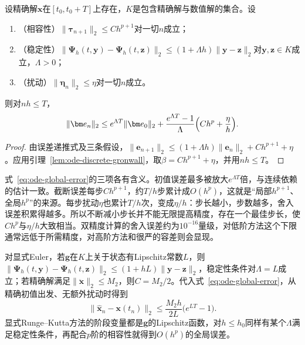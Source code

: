 \begin{theorem}[一步方法的有限时域收敛]
  \label{thm:ode-one-step-convergence}
  设精确解$\bm x$在$[t_0,t_0+T]$上存在，$K$是包含精确解与数值解的集合。设
  \begin{enumerate}
    \item （相容性）$\|\bm\tau_{n+1}\|_2\leq Ch^{p+1}$对一切$n$成立；
    \item （稳定性）$\|\bm\Psi_h(t,\bm y)-\bm\Psi_h(t,\bm z)\|_2\leq(1+\Lambda h)\|\bm y-\bm z\|_2$对$\bm y,\bm z\in K$成立，$\Lambda>0$；
    \item （扰动）$\|\bm\eta_n\|_2\leq\eta$对一切$n$成立。
  \end{enumerate}
  则对$nh\leq T$，
  \begin{equation}
    \|\bm e_n\|_2\leq e^{\Lambda T}\|\bm e_0\|_2+\frac{e^{\Lambda T}-1}{\Lambda}\Bigl(Ch^p+\frac\eta h\Bigr).
    \label{eq:ode-global-error}
  \end{equation}
\end{theorem}

\begin{proof}
  由误差递推式及三条假设，$\|\bm e_{n+1}\|_2\leq(1+\Lambda h)\|\bm e_n\|_2+Ch^{p+1}+\eta$。应用引理~\ref{lem:ode-discrete-gronwall}，取$\beta=Ch^{p+1}+\eta$，并用$nh\leq T$。
\end{proof}

式~\eqref{eq:ode-global-error}的三项各有含义。初值误差最多被放大$e^{\Lambda T}$倍，与连续依赖的估计一致。截断误差每步$Ch^{p+1}$，约$T/h$步累计成$O(h^p)$，这就是“局部$h^{p+1}$、全局$h^p$”的来源。每步扰动$\eta$也累计$T/h$次，变成$\eta/h$：步长越小，步数越多，舍入误差积累得越多。所以不断减小步长并不能无限提高精度，存在一个最佳步长，使$Ch^p$与$\eta/h$大致相当。双精度计算的舍入误差约为$10^{-16}$量级，对低阶方法这个下限通常远低于所需精度，对高阶方法和很严的容差则会显现。

对显式Euler，若$\bm g$在$K$上关于状态有Lipschitz常数$L$，则$\|\bm\Psi_h(t,\bm y)-\bm\Psi_h(t,\bm z)\|_2\leq(1+hL)\|\bm y-\bm z\|_2$，稳定性条件对$\Lambda=L$成立；若精确解满足$\|\ddot{\bm x}\|_2\leq M_2$，则$C=M_2/2$。代入式~\eqref{eq:ode-global-error}，从精确初值出发、无额外扰动时得到
\begin{equation}
  \|\widehat{\bm x}_n-\bm x(t_n)\|_2\leq\frac{M_2h}{2L}\bigl(e^{LT}-1\bigr).
  \label{eq:ode-euler-global-error}
\end{equation}
显式Runge--Kutta方法的阶段变量都是$\bm g$的Lipschitz函数，对$h\leq h_0$同样有某个$\Lambda$满足稳定性条件，再配合$p$阶的相容性就得到$O(h^p)$的全局误差。

